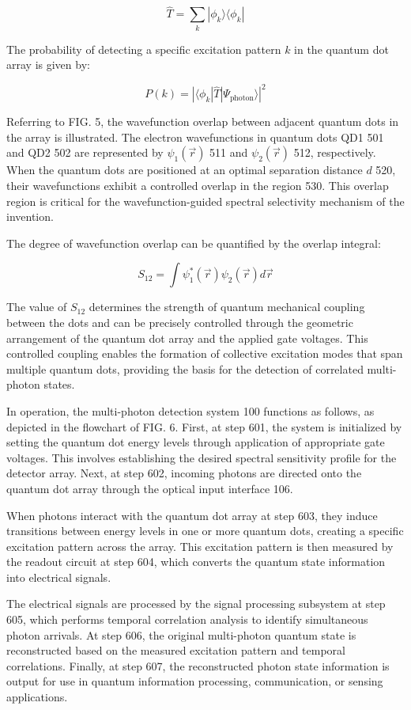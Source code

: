 \documentclass[12pt,letterpaper]{article}
\begin{document}
$$\hat{T} = \sum_k |\phi_k\rangle\langle\phi_k|$$

The probability of detecting a specific excitation pattern $k$ in the quantum dot array is given by:

$$P(k) = |\langle\phi_k|\hat{T}|\Psi_{\text{photon}}\rangle|^2$$

Referring to FIG. 5, the wavefunction overlap between adjacent quantum dots in the array is illustrated. The electron wavefunctions in quantum dots QD1 501 and QD2 502 are represented by $\psi_1(\vec{r})$ 511 and $\psi_2(\vec{r})$ 512, respectively. When the quantum dots are positioned at an optimal separation distance $d$ 520, their wavefunctions exhibit a controlled overlap in the region 530. This overlap region is critical for the wavefunction-guided spectral selectivity mechanism of the invention.

The degree of wavefunction overlap can be quantified by the overlap integral:

$$S_{12} = \int \psi_1^*(\vec{r})\psi_2(\vec{r})d\vec{r}$$

The value of $S_{12}$ determines the strength of quantum mechanical coupling between the dots and can be precisely controlled through the geometric arrangement of the quantum dot array and the applied gate voltages. This controlled coupling enables the formation of collective excitation modes that span multiple quantum dots, providing the basis for the detection of correlated multi-photon states.

In operation, the multi-photon detection system 100 functions as follows, as depicted in the flowchart of FIG. 6. First, at step 601, the system is initialized by setting the quantum dot energy levels through application of appropriate gate voltages. This involves establishing the desired spectral sensitivity profile for the detector array. Next, at step 602, incoming photons are directed onto the quantum dot array through the optical input interface 106.

When photons interact with the quantum dot array at step 603, they induce transitions between energy levels in one or more quantum dots, creating a specific excitation pattern across the array. This excitation pattern is then measured by the readout circuit at step 604, which converts the quantum state information into electrical signals.

The electrical signals are processed by the signal processing subsystem at step 605, which performs temporal correlation analysis to identify simultaneous photon arrivals. At step 606, the original multi-photon quantum state is reconstructed based on the measured excitation pattern and temporal correlations. Finally, at step 607, the reconstructed photon state information is output for use in quantum information processing, communication, or sensing applications.
\end{document}
